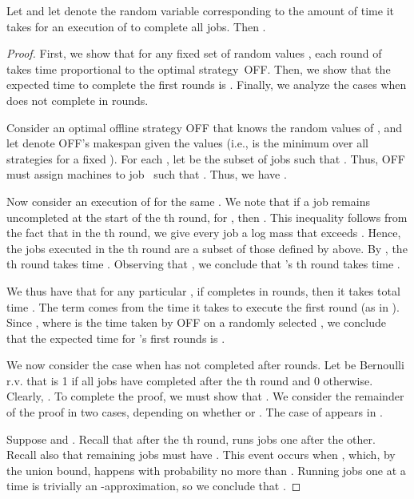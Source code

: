 \newcommand{\indepmthm}{
\begin{theorem} \thmlabel{indepalg}
  Let  and let
   denote the random variable corresponding to
  the amount of time it takes for an execution of \ALGsem to complete
  all jobs. Then . 
\end{theorem}
}
\indepmthm
\begin{proof}
  First, we show that for any fixed set of random values ,
  each round of \ALGsem takes time proportional to the optimal
  strategy~OFF.  Then, we show that the expected time to complete 
  the first  rounds is .  Finally, we analyze the
  cases when \ALGsem does not complete in  rounds.
  
  Consider an optimal offline strategy OFF that knows the random
  values of , and let  denote OFF's
  makespan given the values  (i.e.,  is
  the minimum over all strategies for a fixed ).
  For each , let  be the
  subset of jobs such that .  Thus, OFF must
  assign machines to job~ such that
  . Thus,  we have
  .
  

  Now consider an execution of \ALGsem for the same .  We
  note that if a job  remains uncompleted at the start of the th
  round, for , then .
  This inequality follows from the fact that in the th round,
  we give every job a log mass that exceeds .  Hence,
  the jobs executed in the th round are a subset of those
  defined by  above.  By , the th
  round takes time .  Observing that
  ,
  we conclude that \ALGsem's th round takes time
  .
  
  We thus have that for any particular , if \ALGsem
  completes in  rounds, then it takes total time
  .  The  term
  comes from the time it takes to execute the first round (as
  in ).  Since , where  is
  the time taken by OFF on a randomly selected , we
  conclude that the expected time for \ALGsem's first 
  rounds is .
  
  We now consider the case when \ALGsem has not completed after 
  rounds.  Let  be Bernoulli r.v. that is 1 if all jobs have
  completed after the th round and 0 otherwise. Clearly,
  .  To
  complete the proof, we must show that .  We consider the remainder of
  the proof in two cases, depending on whether  or .
  The case of  appears in .
  
  Suppose  and .  Recall that after the th
  round, \ALGsem runs jobs one after the other.  Recall also that
  remaining jobs must have .  This event occurs
  when , which, by the union bound, happens with
  probability no more than .  Running jobs one at a time is trivially
   an -approximation, so we conclude
  that .
\end{proof}  

